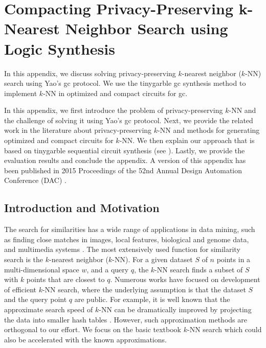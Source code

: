 \chapter{Compacting Privacy-Preserving k-Nearest Neighbor Search using Logic Synthesis}\label{chap:knn}
In this appendix, we discuss solving privacy-preserving $k$-nearest neighbor ($k$-NN) search using Yao's \acrshort{gc} protocol.
We use the \gls{tinygarble} \acrshort{gc} synthesis method to implement $k$-NN in optimized and compact circuits for \acrshort{gc}.

In this appendix, we first introduce the problem of privacy-preserving $k$-NN and the challenge of solving it using Yao's \acrshort{gc} protocol.
Next, we provide the related work in the literature about privacy-preserving $k$-NN and methods for generating optimized and compact circuits for $k$-NN.
We then explain our approach that is based on \gls{tinygarble} sequential circuit synthesis (see ).
Lastly, we provide the evaluation results and conclude the appendix.
A version of this appendix has been published in 2015 Proceedings of the 52nd Annual Design Automation Conference (DAC) \cite{songhori2015compacting}.

\section{Introduction and Motivation}\label{sec:knn-intro}
The search for similarities has a wide range of applications in data mining, such as finding close matches in images, local features, biological and genome data, and multimedia systems \cite{qi2008efficient}.
The most extensively used function for similarity search is the $k$-nearest neighbor ($k$-NN).
For a given dataset $S$ of $n$ points in a multi-dimensional space $w$, and a query $q$, the $k$-NN search finds a subset of $S$ with $k$ points that are closest to $q$.
Numerous works have focused on development of efficient $k$-NN search, where the underlying assumption is that the dataset $S$ and the query point $q$ are public.
For example, it is well known that the approximate search speed of $k$-NN can be dramatically improved by projecting the data into smaller hash tables \cite{andoni2006near,weiss2009spectral}.
However, such approximation methods are orthogonal to our effort.
We focus on the basic textbook $k$-NN search which could also be accelerated with the known approximations.

